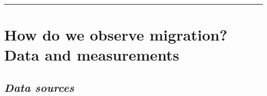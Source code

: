 \documentclass[
]{article}
\begin{document}
\begin{center}\rule{0.5\linewidth}{0.5pt}\end{center}

\hypertarget{how-do-we-observe-migration-data-and-measurements}{%
\section{\texorpdfstring{\textbf{How do we observe migration? Data and
measurements}}{How do we observe migration? Data and measurements}}\label{how-do-we-observe-migration-data-and-measurements}}

\hypertarget{data-sources}{%
\subsection{\texorpdfstring{\emph{Data
sources}}{Data sources}}\label{data-sources}}
\end{document}
